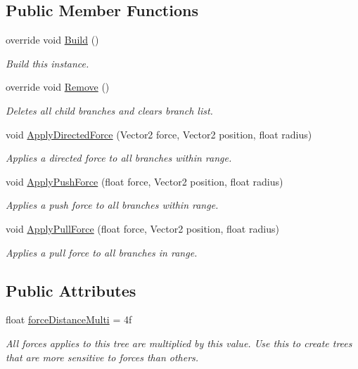 \subsection*{Public Member Functions}
\begin{DoxyCompactItemize}
\item 
override void \hyperlink{class_fractal_tree_1_1_moving_tree_builder_a4c58924b1d19c896cd1af1256ce242eb}{Build} ()
\begin{DoxyCompactList}\small\item\em Build this instance. \end{DoxyCompactList}\item 
override void \hyperlink{class_fractal_tree_1_1_moving_tree_builder_a4b1bc4aee0ed9d1515b7c33c997ace8c}{Remove} ()
\begin{DoxyCompactList}\small\item\em Deletes all child branches and clears branch list. \end{DoxyCompactList}\item 
void \hyperlink{class_fractal_tree_1_1_moving_tree_builder_a7da9440aa0482b959854bb28ff281a9a}{Apply\+Directed\+Force} (Vector2 force, Vector2 position, float radius)
\begin{DoxyCompactList}\small\item\em Applies a directed force to all branches within range. \end{DoxyCompactList}\item 
void \hyperlink{class_fractal_tree_1_1_moving_tree_builder_aac060965e91832c1dfefd94b7c9b152b}{Apply\+Push\+Force} (float force, Vector2 position, float radius)
\begin{DoxyCompactList}\small\item\em Applies a push force to all branches within range. \end{DoxyCompactList}\item 
void \hyperlink{class_fractal_tree_1_1_moving_tree_builder_ace24108b660cb1dcebb609eef51588ed}{Apply\+Pull\+Force} (float force, Vector2 position, float radius)
\begin{DoxyCompactList}\small\item\em Applies a pull force to all branches in range. \end{DoxyCompactList}\end{DoxyCompactItemize}
\subsection*{Public Attributes}
\begin{DoxyCompactItemize}
\item 
float \hyperlink{class_fractal_tree_1_1_moving_tree_builder_a43a9108048a9be7582ba79ed110fff9d}{force\+Distance\+Multi} = 4f
\begin{DoxyCompactList}\small\item\em All forces applies to this tree are multiplied by this value. Use this to create trees that are more sensitive to forces than others. \end{DoxyCompactList}\end{DoxyCompactItemize}
